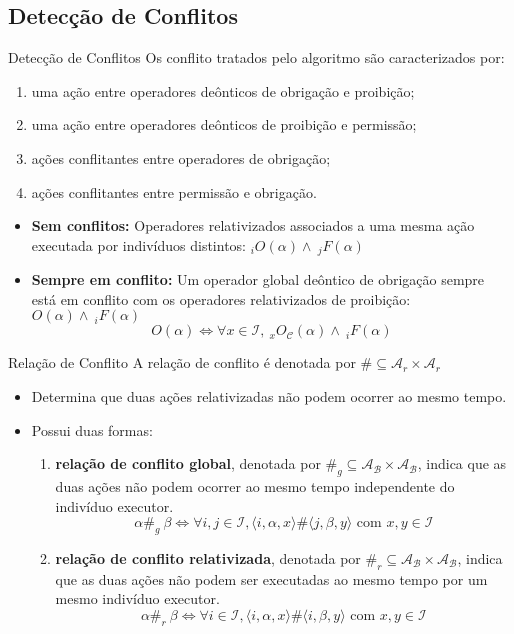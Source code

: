 \subsection{Detecção de Conflitos}
\begin{frame}{Detecção de Conflitos}
    Os conflito tratados pelo algoritmo são caracterizados por:
    \begin{enumerate}
        \item uma ação entre operadores deônticos de obrigação e proibição;
        \item uma ação entre operadores deônticos de proibição e permissão;
        \item ações conflitantes entre operadores de obrigação; 
        \item ações conflitantes entre permissão e obrigação. 
    \end{enumerate} 
    
    \begin{itemize}
        \item \textbf{Sem conflitos:} Operadores relativizados associados a uma mesma ação executada por indivíduos distintos: {\color{blue}$_iO(\alpha) \wedge\ _jF(\alpha)$}
        \item \textbf{Sempre em conflito:} Um operador global deôntico de obrigação sempre está em conflito com os operadores relativizados de proibição: {\color{red}$O(\alpha) \wedge\ _iF(\alpha)$}
        $$O(\alpha) \iff \forall x \in \mathcal{I}, \ _xO_\mathcal{C}(\alpha) \wedge\ _iF(\alpha)$$
    \end{itemize}
\end{frame}

\begin{frame}{Relação de Conflito}
    A relação de conflito é denotada por $\# \subseteq \mathcal{A}_r \times  \mathcal{A}_r$
    \begin{itemize}
        \item Determina que duas ações relativizadas não podem ocorrer ao mesmo tempo.
        \item Possui duas formas: 
        \begin{enumerate}
            \item \textbf{relação de conflito global}, denotada por $\#_g \subseteq \mathcal{A_B} \times \mathcal{A_B}$, indica que as duas ações não podem ocorrer ao mesmo tempo independente do indivíduo executor. 
            $$\alpha\#_g\ \beta \iff \forall i,j \in \mathcal{I}, \langle i, \alpha, x\rangle \# \langle j, \beta, y\rangle \text{ com } x,y \in \mathcal{I}$$
            
            \item \textbf{relação de conflito relativizada}, denotada por $\#_r \subseteq \mathcal{A_B} \times \mathcal{A_B}$, indica que as duas ações não podem ser executadas ao mesmo tempo por um mesmo indivíduo executor.
            $$\alpha\#_r\ \beta \iff \forall i \in \mathcal{I}, \langle i, \alpha, x\rangle \# \langle i, \beta, y\rangle \text{ com } x,y \in \mathcal{I}$$
        \end{enumerate}
    \end{itemize}
\end{frame}

